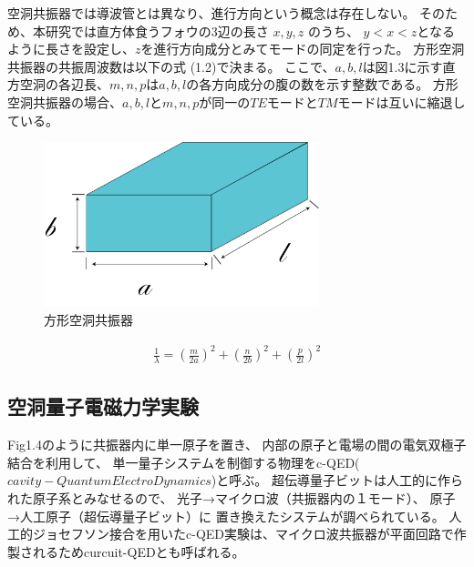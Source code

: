 空洞共振器では導波管とは異なり、進行方向という概念は存在しない。
そのため、本研究では直方体食うフォウの3辺の長さ $x,y,z$ のうち、
$y<x<z$となるように長さを設定し、$z$を進行方向成分とみてモードの同定を行った。
方形空洞共振器の共振周波数は以下の式 (1.2)で決まる。
ここで、$a,b,l$は図1.3に示す直方空洞の各辺長、$m,n,p$は$a,b,l$の各方向成分の腹の数を示す整数である。
方形空洞共振器の場合、$a,b,l$と$m,n,p$が同一の$TE$モードと$TM$モードは互いに縮退している。

\vspace{10 mm}

\begin{figure}[h]
  \begin{center}
    \includegraphics[width=8cm]{./image/空洞共振器.png}
    \caption{方形空洞共振器}
    \label{fig:Cavity}
  \end{center}
\end{figure}

\begin{eqnarray}
    \frac{1}{\lambda} = (\frac{m}{2a})^2 + (\frac{n}{2b})^2 + (\frac{p}{2l})^2
\end{eqnarray}

\subsection*{空洞量子電磁力学実験}
Fig1.4のように共振器内に単一原子を置き、
内部の原子と電場の間の電気双極子結合を利用して、
単一量子システムを制御する物理をc-QED($cavity - Quantum ElectroDynamics$)と呼ぶ。
超伝導量子ビットは人工的に作られた原子系とみなせるので、
光子→マイクロ波（共振器内の１モード）、
原子→人工原子（超伝導量子ビット）に
置き換えたシステムが調べられている。
人工的ジョセフソン接合を用いたc-QED実験は、マイクロ波共振器が平面回路で作製されるためcurcuit-QEDとも呼ばれる。
